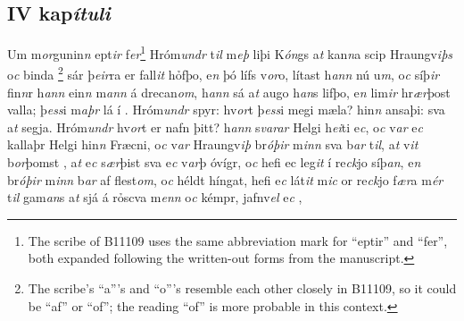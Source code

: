 \beginnumbering \pstart   
\vspace{5mm}\subsection*{IV kap\textit{ítuli}}
Um m\textit{or}gunin\textit{n} ept\textit{ir} f\textit{er}\footnote{
	The scribe of B11109 uses the same abbreviation mark for \enquote{eptir} and \enquote{fer}, both expanded following the written-out forms from the manuscript.}  
Hróm\textit{undr} t\textit{il} m\textit{eþ} liþi K\textit{ón}gs a\textit{t} kan\textit{n}a  scip Hraungv\textit{iþs} o\textit{c} binda  \footnote{
	The scribe's \enquote{a}'s and \enquote{o}'s resemble each other closely in B11109, so it could be \enquote{af} or \enquote{of}; the reading \enquote{of} is more probable in this context.}  
sár þ\textit{eir}ra er fall\textit{it} hỏfþo, 
e\textit{n} þó lífs v\textit{or}o, lítast h\textit{ann} nú u\textit{m},
o\textit{c}  síþ\textit{ir}
fin\textit{n}r h\textit{ann} ein\textit{n} m\textit{ann}  á  drecan\textit{om}, h\textit{ann} sá a\textit{t} augo h\textit{an}s lifþo, e\textit{n}  lim\textit{ir}   hr\textit{ær}þost   valla; 
þ\textit{ess}i  m\textit{aþr} lá í  .
Hróm\textit{undr} spyr: hv\textit{or}t þ\textit{ess}i megi mæla?
hin\textit{n}  ansaþi:   sva a\textit{t} segja. Hróm\textit{undr}  hv\textit{or}t er nafn  þitt? h\textit{ann}
s\textit{varar} Helgi h\textit{ei}ti e\textit{c}, o\textit{c}
v\textit{ar} e\textit{c} kallaþr Helgi hin\textit{n} Fræcni,
o\textit{c} v\textit{ar} Hraungv\textit{iþ} br\textit{óþir} m\textit{inn}
sva b\textit{ar} t\textit{il}, a\textit{t} v\textit{it} b\textit{or}þomst
, a\textit{t} e\textit{c} s\textit{ær}þist sva e\textit{c}
v\textit{ar}þ óvígr, o\textit{c} hefi ec  leg\textit{it} í
re\textit{ck}jo síþ\textit{an}, e\textit{n} br\textit{óþir} m\textit{inn}
b\textit{ar} af flest\textit{om}, o\textit{c} héldt híngat, 
hefi e\textit{c} lát\textit{it} m\textit{ic} or re\textit{ck}jo f\textit{ær}a
m\textit{ér} t\textit{il} gam\textit{an}s a\textit{t} sjá á rỏscva  m\textit{enn} o\textit{c} kémpr, jafnv\textit{el}  e\textit{c} , 
